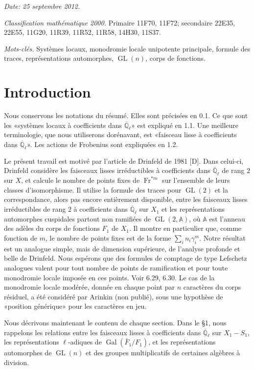 \documentclass[10pt]{article}
\newcommand{\Ql}{\overline{\mathbb Q}_{\ell}}
\newcommand{\Adele}{\mathbb A}
\newcommand{\GL}{\operatorname{GL}}
\newcommand{\Gal}{\operatorname{Gal}}
\newcommand{\Fr}{\operatorname{Fr}}
\theoremstyle{deligne}
\begin{document}
\textit{Date: 25 septembre 2012.}

\textit{Classification mathématique 2000.} Primaire 11F70, 11F72; secondaire 22E35, 22E55, 11G20, 11R39, 11R52, 11R58, 14H30, 11S37.

\textit{Mots-clés.} Systèmes locaux, monodromie locale unipotente principale, formule des traces, représentations automorphes, $\GL(n)$, corps de fonctions.

\section*{Introduction}

Nous conservons les notations du résumé. Elles sont précisées en 0.1. Ce que sont les «systèmes locaux à coefficients dans $\Ql$» est expliqué en 1.1. Une meilleure terminologie, que nous utiliserons dorénavant, est «faisceau lisse à coefficients dans $\Ql$». Les actions de Frobenius sont expliquées en 1.2.

Le présent travail est motivé par l'article de Drinfeld de 1981 [D]. Dans celui-ci, Drinfeld considère les faisceaux lisses irréductibles à coefficients dans $\Ql$ de rang $2$ sur $X$, et calcule le nombre de points fixes de $\Fr^{*m}$ sur l'ensemble de leurs classes d'isomorphisme. Il utilise la formule des traces pour $\GL(2)$ et la correspondance, alors pas encore entièrement disponible, entre les faisceaux lisses irréductibles de rang $2$ à coefficients dans $\Ql$ sur $X_1$ et les représentations automorphes cuspidales partout non ramifiées de $\GL(2,\Adele)$, où $\Adele$ est l'anneau des adèles du corps de fonctions $F_1$ de $X_1$. Il montre en particulier que, comme fonction de $m$, le nombre de points fixes est de la forme $\sum_i n_i\gamma_i^m$. Notre résultat est un analogue simple, mais de dimension supérieure, de l'analyse profonde et belle de Drinfeld. Nous espérons que des formules de comptage de type Lefschetz analogues valent pour tout nombre de points de ramification et pour toute monodromie locale imposée en ces points. Voir 6.29, 6.30. Le cas de la monodromie locale modérée, donnée en chaque point par $n$ caractères du corps résiduel, a été considéré par Arinkin (non publié), sous une hypothèse de «position générique» pour les caractères en jeu.

Nous décrivons maintenant le contenu de chaque section. Dans le \S1, nous rappelons les relations entre les faisceaux lisses à coefficients dans $\Ql$ sur $X_1-S_1$, les représentations $\ell$-adiques de $\Gal(\bar F_1/F_1)$, et les représentations automorphes de $\GL(n)$ et des groupes multiplicatifs de certaines algèbres à division.
\end{document}
